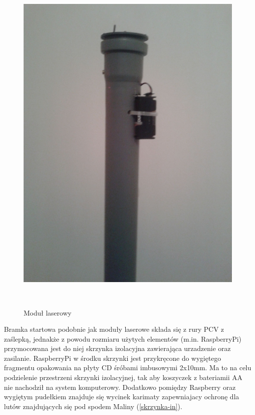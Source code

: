 \documentclass[11pt,a4paper, twoside]{article}
\begin{document}
\begin{figure}[H]
\begin{center}
\includegraphics[scale=0.10]{./img/laser1.jpg}
\caption{Moduł laserowy}
$\label{laser-1}$
\end{center}
\end{figure}
\newpage
Bramka startowa podobnie jak moduły laserowe składa się z rury PCV z zaślepką, jednakże z powodu rozmiaru użytych elementów (m.in. RaspberryPi) przymocowana jest do niej skrzynka izolacyjna zawierająca urzadzenie oraz zasilanie. RaspberryPi w środku skrzynki jest przykręcone do wygiętego fragmentu opakowania na płyty CD śróbami imbusowymi 2x10mm. Ma to na celu podzielenie przestrzeni skrzynki izolacyjnej, tak aby koszyczek z bateriamii AA nie nachodził na system komputerowy. Dodatkowo pomiędzy Raspberry oraz wygiętym pudełkiem znajduje się wycinek karimaty zapewniajacy ochronę dla lutów znajdujących się pod spodem Maliny (\ref{skrzynka-in}).
\end{document}
